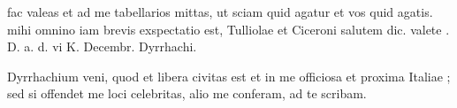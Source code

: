  fac valeas et ad me tabellarios mittas, ut sciam quid agatur et vos quid agatis. mihi omnino iam brevis exspectatio est, Tulliolae et Ciceroni salutem dic. valete . D. a. d. vi K. Decembr. Dyrrhachi.

 Dyrrhachium veni, quod et libera civitas est et in me officiosa et proxima Italiae ; sed si offendet me loci celebritas, alio me conferam, ad te scribam.
